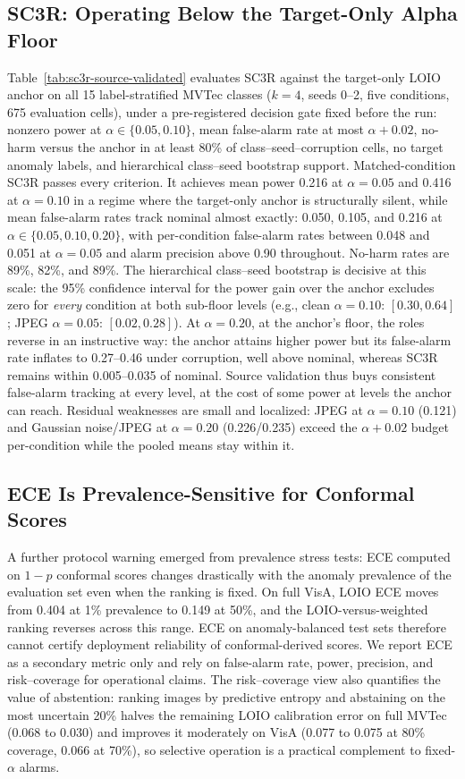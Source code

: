 \subsection{SC3R: Operating Below the Target-Only Alpha Floor}

Table~\ref{tab:sc3r-source-validated} evaluates SC3R against the target-only LOIO anchor on all 15 label-stratified MVTec classes ($k{=}4$, seeds 0--2, five conditions, 675 evaluation cells), under a pre-registered decision gate fixed before the run: nonzero power at $\alpha\in\{0.05,0.10\}$, mean false-alarm rate at most $\alpha{+}0.02$, no-harm versus the anchor in at least 80\% of class--seed--corruption cells, no target anomaly labels, and hierarchical class--seed bootstrap support. Matched-condition SC3R passes every criterion. It achieves mean power 0.216 at $\alpha{=}0.05$ and 0.416 at $\alpha{=}0.10$ in a regime where the target-only anchor is structurally silent, while mean false-alarm rates track nominal almost exactly: 0.050, 0.105, and 0.216 at $\alpha\in\{0.05,0.10,0.20\}$, with per-condition false-alarm rates between 0.048 and 0.051 at $\alpha{=}0.05$ and alarm precision above 0.90 throughout. No-harm rates are 89\%, 82\%, and 89\%. The hierarchical class--seed bootstrap is decisive at this scale: the 95\% confidence interval for the power gain over the anchor excludes zero for \emph{every} condition at both sub-floor levels (e.g., clean $\alpha{=}0.10$: $[0.30,0.64]$; JPEG $\alpha{=}0.05$: $[0.02,0.28]$). At $\alpha{=}0.20$, at the anchor's floor, the roles reverse in an instructive way: the anchor attains higher power but its false-alarm rate inflates to 0.27--0.46 under corruption, well above nominal, whereas SC3R remains within 0.005--0.035 of nominal. Source validation thus buys consistent false-alarm tracking at every level, at the cost of some power at levels the anchor can reach. Residual weaknesses are small and localized: JPEG at $\alpha{=}0.10$ (0.121) and Gaussian noise/JPEG at $\alpha{=}0.20$ (0.226/0.235) exceed the $\alpha{+}0.02$ budget per-condition while the pooled means stay within it.

\subsection{ECE Is Prevalence-Sensitive for Conformal Scores}
A further protocol warning emerged from prevalence stress tests: ECE computed on $1-p$ conformal scores changes drastically with the anomaly prevalence of the evaluation set even when the ranking is fixed. On full VisA, LOIO ECE moves from 0.404 at 1\% prevalence to 0.149 at 50\%, and the LOIO-versus-weighted ranking reverses across this range. ECE on anomaly-balanced test sets therefore cannot certify deployment reliability of conformal-derived scores. We report ECE as a secondary metric only and rely on false-alarm rate, power, precision, and risk--coverage for operational claims. The risk--coverage view also quantifies the value of abstention: ranking images by predictive entropy and abstaining on the most uncertain 20\% halves the remaining LOIO calibration error on full MVTec (0.068 to 0.030) and improves it moderately on VisA (0.077 to 0.075 at 80\% coverage, 0.066 at 70\%), so selective operation is a practical complement to fixed-$\alpha$ alarms.

